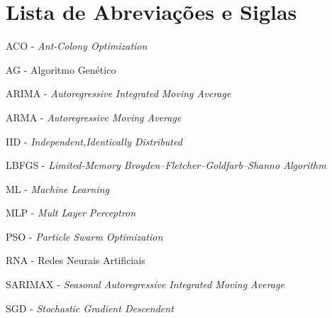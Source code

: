 \chapter*{Lista de Abreviações e Siglas}
\linespread{1.5}

ACO - \textit{Ant-Colony Optimization}\bigskip

AG - Algoritmo Genético\bigskip

ARIMA - \textit{Autoregressive Integrated Moving Average}\bigskip

ARMA - \textit{Autoregressive Moving Average}\bigskip

IID - \textit{Independent,Identically Distributed}\bigskip

LBFGS - \textit{Limited-Memory Broyden–Fletcher–Goldfarb–Shanno Algorithm}\bigskip

ML - \textit{Machine Learning}\bigskip

MLP - \textit{Mult Layer Perceptron}\bigskip

PSO - \textit{Particle Swarm Optimization}\bigskip

RNA - Redes Neurais Artificiais\bigskip

SARIMAX - \textit{Seasonal Autoregressive Integrated Moving Average}\bigskip

SGD - \textit{Stochastic Gradient Descendent}\bigskip


